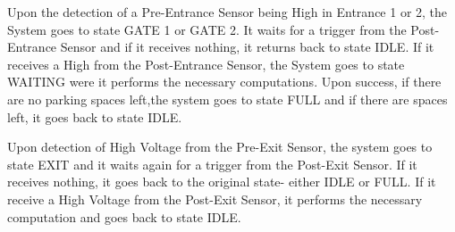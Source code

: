 \documentclass[11pt,a4paper,twocolumn]{article}
\begin{document}
Upon the detection of a Pre-Entrance Sensor being High in Entrance 1 or 2, the System goes to state GATE 1 or GATE 2. It waits for a trigger from the Post-Entrance Sensor and if it receives nothing, it returns back to state IDLE. If it receives a High from the Post-Entrance Sensor, the System goes to state WAITING were it performs the necessary computations. Upon success, if there are no parking spaces left,the system goes to state FULL and if there are spaces left, it goes back to state IDLE. 

Upon detection of High Voltage from the Pre-Exit Sensor, the system goes to state EXIT and it waits again for a trigger from the Post-Exit Sensor. If it receives nothing, it goes back to the original state- either IDLE or FULL. If it receive a High Voltage from the Post-Exit Sensor, it performs the necessary computation and goes back to state IDLE. 
\end{document}
